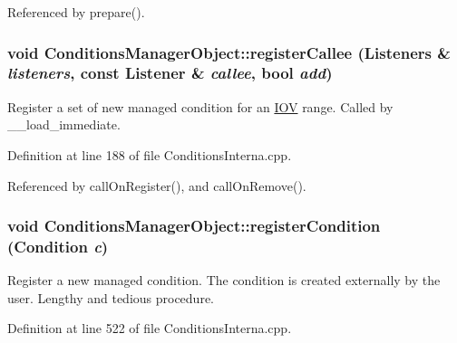 Referenced by prepare().\hypertarget{class_d_d4hep_1_1_conditions_1_1_conditions_manager_object_ac945da1c9e23ba4e7db40221a38d4abc}{
\subsubsection[{registerCallee}]{\setlength{\rightskip}{0pt plus 5cm}void ConditionsManagerObject::registerCallee ({\bf Listeners} \& {\em listeners}, \/  const {\bf Listener} \& {\em callee}, \/  bool {\em add})}}
\label{class_d_d4hep_1_1_conditions_1_1_conditions_manager_object_ac945da1c9e23ba4e7db40221a38d4abc}


Register a set of new managed condition for an \hyperlink{class_d_d4hep_1_1_i_o_v}{IOV} range. Called by \_\-\_\-load\_\-immediate. 

Definition at line 188 of file ConditionsInterna.cpp.

Referenced by callOnRegister(), and callOnRemove().\hypertarget{class_d_d4hep_1_1_conditions_1_1_conditions_manager_object_af839b57cfdda205e2555e757651423fd}{
\subsubsection[{registerCondition}]{\setlength{\rightskip}{0pt plus 5cm}void ConditionsManagerObject::registerCondition ({\bf Condition} {\em c})}}
\label{class_d_d4hep_1_1_conditions_1_1_conditions_manager_object_af839b57cfdda205e2555e757651423fd}


Register a new managed condition. The condition is created externally by the user. Lengthy and tedious procedure. 

Definition at line 522 of file ConditionsInterna.cpp.

